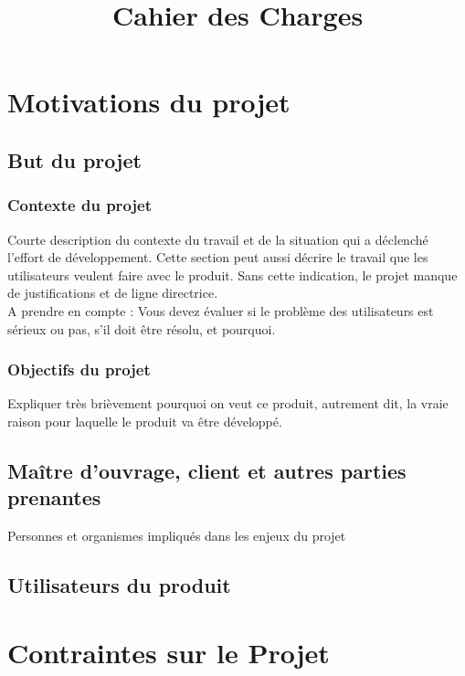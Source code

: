 

\title{\textbf{\Huge Cahier des Charges}\vspace{-2ex}}


\maketitle
\vspace{4ex}
\tableofcontents
\newpage

	\section{Motivations du projet}
		\subsection{But du projet}
		
			\subsubsection{Contexte du projet}
			Courte description du contexte du travail et de la situation qui a déclenché l’effort de développement. Cette section peut aussi décrire le travail que les utilisateurs veulent faire avec le produit.
			Sans cette indication, le projet manque de justifications et de ligne directrice.\\
			A prendre en compte :
			Vous devez évaluer si le problème des utilisateurs est sérieux ou pas, s’il doit être résolu, et pourquoi.
		
			\subsubsection{Objectifs du projet}
			Expliquer très brièvement pourquoi on veut ce produit, autrement dit, la vraie raison pour laquelle le produit va être développé.
		
		\subsection{Maître d'ouvrage, client et autres parties prenantes}
			Personnes et organismes impliqués dans les enjeux du projet
			
		\subsection{Utilisateurs du produit}
		
	\section{Contraintes sur le Projet}
